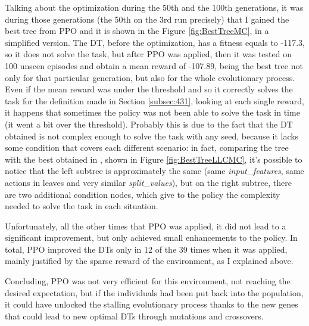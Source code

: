Talking about the optimization during the 50th and the 100th generations, it was during those generations (the 50th on the 3rd run precisely) that I gained the best tree from PPO and it is shown in the Figure \ref{fig:BestTreeMC}, in a simplified version. The DT, before the optimization, has a fitness equals to -117.3, so it does not solve the task, but after PPO was applied, then it was tested on 100 unseen episodes and obtain a mean reward of -107.89, being the best tree not only for that particular generation, but also for the whole evolutionary process. Even if the mean reward was under the threshold and so it correctly solves the task for the definition made in Section \ref{subsec:431}, looking at each single reward, it happens that sometimes the policy was not been able to solve the task in time (it went a bit over the threshold). Probably this is due to the fact that the DT obtained is not complex enough to solve the task with any seed, because it lacks some condition that covers each different scenario: in fact, comparing the tree with the best obtained in \cite{custode}, shown in Figure \ref{fig:BestTreeLLCMC}, it's possible to notice that the left subtree is approximately the same (same \textit{input\_features}, same actions in leaves and very similar \textit{split\_values}), but on the right subtree, there are two additional condition nodes, which give to the policy the complexity needed to solve the task in each situation.

Unfortunately, all the other times that PPO was applied, it did not lead to a significant improvement, but only achieved small enhancements to the policy. In total, PPO improved the DTs only in 12 of the 39 times when it was applied, mainly justified by the sparse reward of the environment, as I explained above.

Concluding, PPO was not very efficient for this environment, not reaching the desired expectation, but if the individuals had been put back into the population, it could have unlocked the stalling evolutionary process thanks to the new genes that could lead to new optimal DTs through mutations and crossovers.
\vspace{0.3in}

